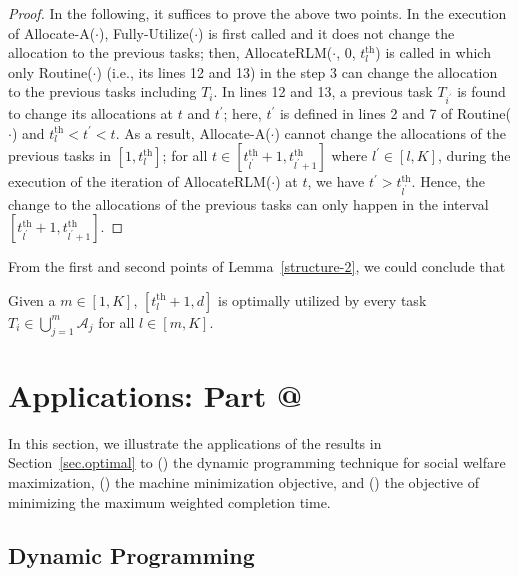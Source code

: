 \documentclass[10pt,journal,compsoc]{IEEEtran}
\makeatletter
\newcommand{\tth}{t^{\textrm{th}}}
\newcommand{\rmnum}[1]{\romannumeral #1}
\newcommand{\Rmnum}[1]{\expandafter\@slowromancap\romannumeral #1@}
\makeatother
\begin{document}
\begin{proof}
In the following, it suffices to prove the above two points. In the execution of Allocate-A($\cdot$), Fully-Utilize($\cdot$) is first called and it does not change the allocation to the previous tasks; then, AllocateRLM($\cdot$, 0, $\tth_{l}$) is called in which only Routine($\cdot$) (i.e., its lines 12 and 13) in the step 3 can change the allocation to the previous tasks including $T_{i}$. In lines 12 and 13, a previous task $T_{i^{\prime}}$ is found to change its allocations at $t$ and $t^{\prime}$; here, $t^{\prime}$ is defined in lines 2 and 7 of Routine($\cdot$) and $\tth_{l}<t^{\prime}<t$. As a result, Allocate-A($\cdot$) cannot change the allocations of the previous tasks in $[1, \tth_{l}]$; for all $t\in [\tth_{l^{\prime}}+1, \tth_{l^{\prime}+1}]$ where $l^{\prime}\in [l, K]$, during the execution of the iteration of AllocateRLM($\cdot$) at $t$, we have $t^{\prime}>\tth_{l^{\prime}}$. Hence, the change to the allocations of the previous tasks can only happen in the interval $[\tth_{l^{\prime}}+1, \tth_{l^{\prime}+1}]$.
\end{proof}


From the first and second points of Lemma~\ref{structure-2}, we could conclude that
\begin{proposition}\label{fully-2}
Given a $m\in [1, K]$, $\left[ \tth_{l}+1, d \right]$ is optimally utilized by every task $T_{i} \in \bigcup_{j=1}^{m}{\mathcal{A}_{j}}$ for all $l\in [m, K]$.
\end{proposition}










\section{Applications: Part \Rmnum{2}}
\label{more-app-2}

In this section, we illustrate the applications of the results in Section~\ref{sec.optimal} to (\rmnum{1}) the dynamic programming technique for social welfare maximization, (\rmnum{2}) the machine minimization objective, and (\rmnum{3}) the objective of minimizing the maximum weighted completion time.


\subsection{Dynamic Programming}
\end{document}
